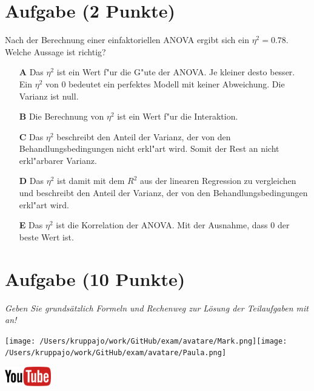 \documentclass[a4paper, 9pt]{scrartcl}\usepackage[]{graphicx}\usepackage[]{xcolor}
\begin{document}
\section{Aufgabe \hfill (2 Punkte)}





Nach der Berechnung einer einfaktoriellen ANOVA ergibt sich ein $\eta^2 = 0.78$. Welche Aussage ist richtig?



\begin{enumerate}
\item [\textbf{A} \msquare] Das $\eta^2$ ist ein Wert f{"u}r die G{"u}te der ANOVA. Je kleiner desto besser. Ein $\eta^2$ von 0 bedeutet ein perfektes Modell mit keiner Abweichung. Die Varianz ist null.
\item [\textbf{B} \msquare] Die Berechnung von $\eta^2$ ist ein Wert f{"u}r die Interaktion.
\item [\textbf{C} \msquare] Das $\eta^2$ beschreibt den Anteil der Varianz, der von den Behandlungsbedingungen nicht erkl{"a}rt wird. Somit der Rest an nicht erkl{"a}rbarer Varianz.
\item [\textbf{D} \msquare] Das $\eta^2$ ist damit mit dem $R^2$ aus der linearen Regression zu vergleichen und beschreibt den Anteil der Varianz, der von den Behandlungsbedingungen erkl{"a}rt wird.
\item [\textbf{E} \msquare] Das $\eta^2$ ist die Korrelation der ANOVA. Mit der Ausnahme, dass 0 der beste Wert ist.
\end{enumerate}

\clearpage

\section{Aufgabe \hfill (10 Punkte)}

\textit{Geben Sie grundsätzlich Formeln und Rechenweg zur Lösung der Teilaufgaben mit an!} \\[1Ex]
 

 
\begin{minipage}[t]{0.5\textwidth}
\texttt{[image: /Users/kruppajo/work/GitHub/exam/avatare/Mark.png]}\hspace{-4mm}\texttt{[image: /Users/kruppajo/work/GitHub/exam/avatare/Paula.png]}
\end{minipage}
\begin{minipage}[t]{0.5\textwidth}
\hfill
\href{https://youtu.be/kHmfEmU6lrk}{\includegraphics[width = 2cm]{img/youtube}}
\end{minipage}
\end{document}
